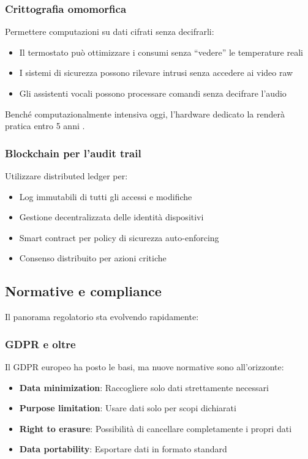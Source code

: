 \subsubsection{Crittografia omomorfica}

Permettere computazioni su dati cifrati senza decifrarli:

\begin{itemize}
    \item Il termostato può ottimizzare i consumi senza ``vedere'' le temperature reali
    \item I sistemi di sicurezza possono rilevare intrusi senza accedere ai video raw
    \item Gli assistenti vocali possono processare comandi senza decifrare l'audio
\end{itemize}

Benché computazionalmente intensiva oggi, l'hardware dedicato la renderà pratica entro 5 anni \parencite{liu2022homomorphic}.

\subsubsection{Blockchain per l'audit trail}

Utilizzare distributed ledger per:

\begin{itemize}
    \item Log immutabili di tutti gli accessi e modifiche
    \item Gestione decentralizzata delle identità dispositivi
    \item Smart contract per policy di sicurezza auto-enforcing
    \item Consenso distribuito per azioni critiche
\end{itemize}

\subsection{Normative e compliance}

Il panorama regolatorio sta evolvendo rapidamente:

\subsubsection{GDPR e oltre}

Il GDPR europeo ha posto le basi, ma nuove normative sono all'orizzonte:

\begin{itemize}
    \item \textbf{Data minimization}: Raccogliere solo dati strettamente necessari
    \item \textbf{Purpose limitation}: Usare dati solo per scopi dichiarati
    \item \textbf{Right to erasure}: Possibilità di cancellare completamente i propri dati
    \item \textbf{Data portability}: Esportare dati in formato standard
\end{itemize}


